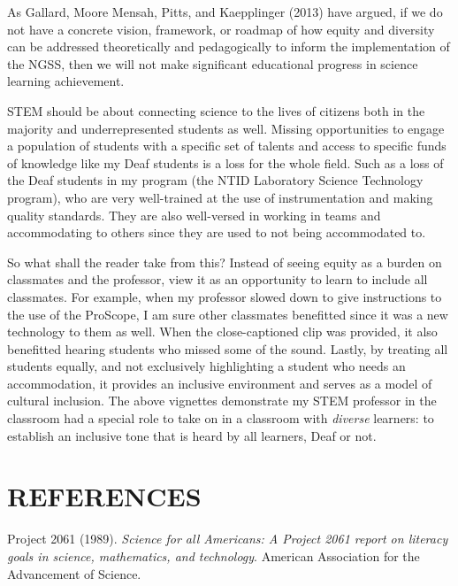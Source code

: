 \documentclass[11.5pt]{sig-alternate} %
\begin{document}
\begin{large}
As Gallard, Moore Mensah, Pitts, and Kaepplinger (2013) have argued, if we do not have a concrete vision, framework, or roadmap of how equity and diversity can be addressed theoretically and pedagogically to inform the implementation of the NGSS, then we will not make significant educational progress in science learning achievement.

STEM should be about connecting science to the lives of citizens both in the majority and underrepresented students as well.  Missing opportunities to engage a population of students with a specific set of talents and access to specific funds of knowledge like my Deaf students is a loss for the whole field.  Such as a loss of the Deaf students in my program (the NTID Laboratory Science Technology program), who are very well-trained at the use of instrumentation and making quality standards.  They are also well-versed in working in teams and accommodating to others since they are used to not being accommodated to.  

So what shall the reader take from this?  Instead of seeing equity as a burden on classmates and the professor, view it as an opportunity to learn to include all classmates.  For example, when my professor slowed down to give instructions to the use of the ProScope, I am sure other classmates benefitted since it was a new technology to them as well.  When the close-captioned clip was provided, it also benefitted hearing students who missed some of the sound. Lastly, by treating all students equally, and not exclusively highlighting a student who needs an accommodation, it provides an inclusive environment and serves as a model of cultural inclusion.  The above vignettes demonstrate my STEM professor in the classroom had a special role to take on in a classroom with \textit{diverse} learners: to establish an inclusive tone that is heard by all learners, Deaf or not.

\end{large}
\clearpage
\section*{REFERENCES}\par 

\leftskip 0.25in
\parindent -0.25in 

Project 2061 (1989). \textit{Science for all Americans: A Project 2061 report on literacy goals in science, mathematics, and technology}. American Association for the Advancement of Science.
\end{document}

